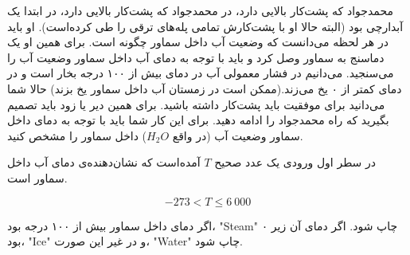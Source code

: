 \begin{problem}{}
{}{}
{}{}{}
    محمدجواد که پشت‌کار بالایی دارد، در محمدجواد که پشت‌کار بالایی دارد، در ابتدا یک آبدارچی بود (البته حالا او با پشت‌کارش تمامی پله‌های ترقی را طی کرده‌است). او باید در هر لحظه می‌دانست که وضعیت آب داخل سماور چگونه است. برای همین او یک دماسنج به سماور وصل کرد و باید با توجه به دمای آب داخل سماور وضعیت آب را می‌سنجید. می‌دانیم در فشار معمولی آب در دمای بیش از ۱۰۰ درجه بخار است و در دمای کمتر از ۰ یخ می‌زند.(ممکن است در زمستان آب داخل سماور یخ بزند)
    حالا شما می‌دانید برای موفقیت باید پشت‌کار داشته باشید. برای همین دیر یا زود باید تصمیم بگیرید که راه محمدجواد را ادامه دهید. برای این کار شما باید با توجه به دمای داخل سماور وضعیت آب (در واقع $H_2O$) داخل سماور را مشخص کنید.
    
    \InputFile
در سطر اول ورودی یک عدد صحیح $T$ آمده‌است که نشان‌دهنده‌ی دمای آب داخل سماور است.

$$ -273 < T \le 6\ 000$$



    \OutputFile

    اگر دمای داخل سماور بیش از ۱۰۰ درجه بود، "Steam" چاپ شود. اگر دمای آن زیر ۰ بود، "Ice" و در غیر این صورت، "Water" چاپ شود.
    \Examples

    \begin{example}
    \end{example}

    \begin{example}
    \end{example}

    \begin{example}
    \end{example}


\end{problem}

